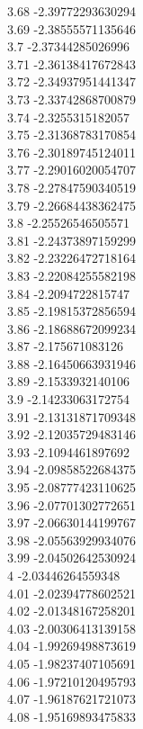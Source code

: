 {3.68	-2.39772293630294\\
3.69	-2.38555571135646\\
3.7	-2.37344285026996\\
3.71	-2.36138417672843\\
3.72	-2.34937951441347\\
3.73	-2.33742868700879\\
3.74	-2.3255315182057\\
3.75	-2.31368783170854\\
3.76	-2.30189745124011\\
3.77	-2.29016020054707\\
3.78	-2.27847590340519\\
3.79	-2.26684438362475\\
3.8	-2.25526546505571\\
3.81	-2.24373897159299\\
3.82	-2.23226472718164\\
3.83	-2.22084255582198\\
3.84	-2.2094722815747\\
3.85	-2.19815372856594\\
3.86	-2.18688672099234\\
3.87	-2.175671083126\\
3.88	-2.16450663931946\\
3.89	-2.1533932140106\\
3.9	-2.14233063172754\\
3.91	-2.13131871709348\\
3.92	-2.12035729483146\\
3.93	-2.1094461897692\\
3.94	-2.09858522684375\\
3.95	-2.08777423110625\\
3.96	-2.07701302772651\\
3.97	-2.06630144199767\\
3.98	-2.05563929934076\\
3.99	-2.04502642530924\\
4	-2.03446264559348\\
4.01	-2.02394778602521\\
4.02	-2.01348167258201\\
4.03	-2.00306413139158\\
4.04	-1.99269498873619\\
4.05	-1.98237407105691\\
4.06	-1.97210120495793\\
4.07	-1.96187621721073\\
4.08	-1.95169893475833\\
}
